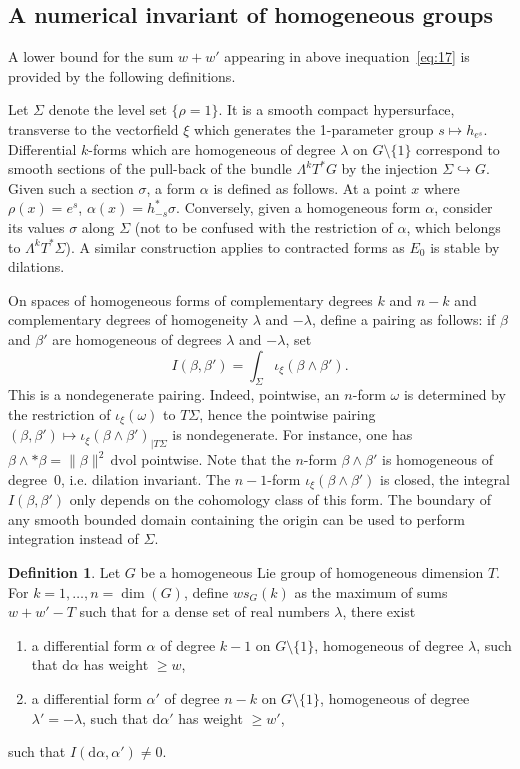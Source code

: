 \documentclass[11pt]{article}
\theoremstyle{definition}
\newtheorem{defi}[theo]{Definition}
\numberwithin{equation}{section}
\numberwithin{figure}{section}
\numberwithin{table}{section}
\newcommand{\dd}{\mathrm{d}}
\newcommand{\dalpha}{\dd \alpha}
\newcommand{\dvol}{\dd \mathrm{vol}}
\begin{document}
\subsection{A numerical invariant of homogeneous groups}

A lower bound for the sum $w+w'$ appearing in above inequation~\eqref{eq:17} is provided by the following definitions.

Let $\Sigma$ denote the level set $\{\rho=1\}$. It is a smooth compact hypersurface, transverse to the vectorfield $\xi$ which generates the 1-parameter group $s\mapsto h_{e^s}$. Differential $k$-forms which are homogeneous of degree $\lambda$ on $G\setminus\{1\}$ correspond to smooth sections of the pull-back of the bundle $\Lambda^k T^* G$ by the injection $\Sigma\hookrightarrow G$. Given such a section $\sigma$, a form $\alpha$ is defined as follows. At a point $x$ where $\rho(x)=e^s$, $\alpha(x)= h_{-s}^*\sigma$. Conversely, given a homogeneous form $\alpha$, consider its values $\sigma$ along $\Sigma$ (not to be confused with the restriction of $\alpha$, which belongs to $\Lambda^k T^* \Sigma$). A similar construction applies to contracted forms as $E_0$ is stable by dilations.

On spaces of homogeneous forms of complementary degrees $k$ and $n-k$ and complementary degrees of homogeneity $\lambda$ and $-\lambda$, define a pairing as follows: if $\beta$ and $\beta'$ are homogeneous of degrees $\lambda$ and $-\lambda$, set
\[
I(\beta,\beta')=\int_{\Sigma}\iota_\xi(\beta\wedge\beta').
\]
This is a nondegenerate pairing. Indeed, pointwise, an $n$-form $\omega$ is determined by the restriction of $\iota_\xi(\omega)$ to $T\Sigma$, hence the pointwise pairing $(\beta,\beta')\mapsto \iota_\xi(\beta\wedge\beta')_{|T\Sigma}$ is nondegenerate. For instance, one has $\beta \wedge * \beta = \|\beta\|^2 \,\dvol$ pointwise. Note that the $n$-form $\beta\wedge\beta'$ is homogeneous of degree~$0$, i.e. dilation invariant. The $n-1$-form $\iota_\xi(\beta\wedge\beta')$ is closed, the integral $I(\beta,\beta')$ only depends on the cohomology class of this form. The boundary of any smooth bounded domain containing the origin can be used to perform integration instead of $\Sigma$.


\begin{defi}\label{dfi:wsG}
Let $G$ be a homogeneous Lie group of homogeneous dimension $T$. For $k=1,\dots,n= \dim(G)$, define $ws_G(k)$ as the maximum of sums $w+w'-T$ such that for a dense set of real numbers $\lambda$, there exist
\begin{enumerate}
\item a differential form $\alpha$ of degree $k-1$ on $G\setminus\{1\}$, homogeneous of degree $\lambda$, such that $\dalpha$ has weight $\geq w$,
\item a differential form $\alpha'$ of degree $n-k$ on $G\setminus\{1\}$, homogeneous of degree $\lambda'=-\lambda$, such that $\dalpha'$ has weight $\geq w'$,
\end{enumerate}
such that $ I(\dalpha,\alpha')\not=0$.
\end{defi}
\end{document}
